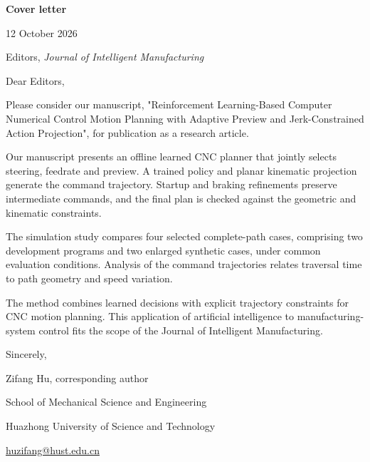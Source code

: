 \documentclass[11pt,a4paper]{article}
\begin{document}
{\large\bfseries Cover letter}\par
12 October 2026\par
Editors, \textit{Journal of Intelligent Manufacturing}\par
Dear Editors,\par
Please consider our manuscript, "Reinforcement Learning-Based Computer Numerical Control Motion Planning with Adaptive Preview and Jerk-Constrained Action Projection", for publication as a research article.

Our manuscript presents an offline learned CNC planner that jointly selects steering, feedrate and preview. A trained policy and planar kinematic projection generate the command trajectory. Startup and braking refinements preserve intermediate commands, and the final plan is checked against the geometric and kinematic constraints.

The simulation study compares four selected complete-path cases, comprising two development programs and two enlarged synthetic cases, under common evaluation conditions. Analysis of the command trajectories relates traversal time to path geometry and speed variation.

The method combines learned decisions with explicit trajectory constraints for CNC motion planning. This application of artificial intelligence to manufacturing-system control fits the scope of the Journal of Intelligent Manufacturing.

Sincerely,\par
Zifang Hu, corresponding author\par
School of Mechanical Science and Engineering\par
Huazhong University of Science and Technology\par
\href{mailto:huzifang@hust.edu.cn}{huzifang@hust.edu.cn}
\end{document}
